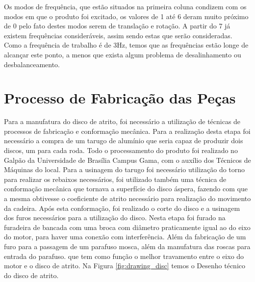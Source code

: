 Os modos de frequência, que estão situados na primeira coluna condizem com os
modos em que o produto foi excitado, os valores de 1 até 6 deram muito próximo
de 0 pelo fato destes modos serem de translação e rotação. A partir do 7 já
existem frequências consideráveis, assim sendo estas que serão consideradas.
Como a frequência de trabalho é de 3Hz, temos que as frequências estão longe de
alcançar este ponto, a menos que exista algum problema de desalinhamento ou
desbalanceamento.

\section{Processo de Fabricação das Peças}

Para a manufatura do disco de atrito, foi necessário a utilização de técnicas de
processos de fabricação e conformação mecânica. Para a realização desta etapa
foi necessário a compra de um tarugo de alumínio que seria capaz de produzir
dois discos, um para cada roda. Todo o processamento do produto foi realizado
no Galpão da Universidade de Brasília Campus Gama, com o auxílio dos Técnicos
de Máquinas do local. Para a usinagem do tarugo foi necessário utilização do
torno para realizar os rebaixos necessários, foi utilizado também  uma técnica
de conformação mecânica que tornava a superfície do disco áspera, fazendo com
que a mesma obtivesse o coeficiente de atrito necessário para realização do
movimento da cadeira. Após esta conformação, foi realizado o corte do disco e a
usinagem dos furos necessários para a utilização do disco. Nesta etapa foi
furado na furadeira de bancada com uma broca com diâmetro praticamente igual ao
do eixo do motor, para haver uma conexão com interferência. Além da fabricação
de um furo para a passagem de um parafuso mosca, além da manufatura das roscas
para entrada do parafuso. que tem como função o melhor travamento entre o eixo
do motor e o disco de atrito. Na Figura \ref{fig:drawing_disc} temos o Desenho técnico do disco de
atrito.

